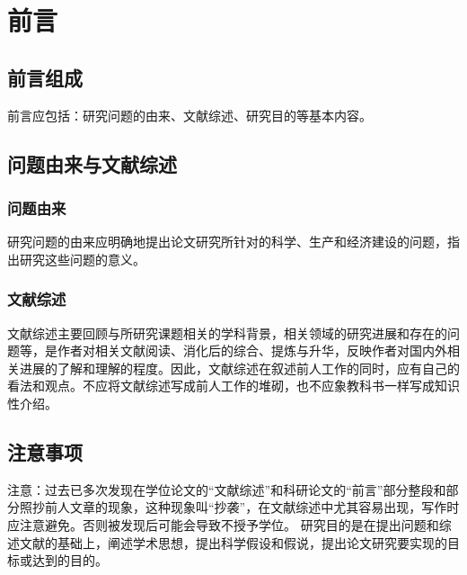 \documentclass[a4paper]{article}
\newcommand{\song}{\CJKfamily{song}}
\newcommand{\kai}{\CJKfamily{kai}}
\newcommand{\xiaosihao}{\fontsize{12pt}{18pt}\selectfont}
\newcommand{\wuhao}{\fontsize{10.5pt}{18pt}\selectfont}
\newcommand{\sectionbreak}{\clearpage} %
\newcommand\seccontent{
	\song
	\xiaosihao %
    \setlength{\parindent}{2em} %
    \setlength{\parskip}{0pt}
    }
\theoremstyle{definition}
\theoremstyle{plain}
\theoremstyle{remark}
\newcommand{\hongzifuzhu}[1]{\textcolor{red}{\kai \wuhao(#1)}}
\begin{document}
\vspace*{-1em}
\tableofcontents
\thispagestyle{main}


\clearpage
\setcounter{page}{1}
\renewcommand{\thepage}{\arabic{page}}

\seccontent
\section{前言}

\subsection{前言组成}
前言应包括：研究问题的由来、文献综述、研究目的等基本内容。


\subsection{问题由来与文献综述}


\subsubsection{问题由来}
研究问题的由来应明确地提出论文研究所针对的科学、生产和经济建设的问题，指出研究这些问题的意义。


\subsubsection{文献综述}
文献综述主要回顾与所研究课题相关的学科背景，相关领域的研究进展和存在的问题等，是作者对相关文献阅读、消化后的综合、提炼与升华，反映作者对国内外相关进展的了解和理解的程度。因此，文献综述在叙述前人工作的同时，应有自己的看法和观点。不应将文献综述写成前人工作的堆砌，也不应象教科书一样写成知识性介绍。


\subsection{注意事项}
注意：过去已多次发现在学位论文的“文献综述”和科研论文的“前言”部分整段和部分照抄前人文章的现象，这种现象叫“抄袭”，在文献综述中尤其容易出现，写作时应注意避免。否则被发现后可能会导致不授予学位。
研究目的是在提出问题和综述文献的基础上，阐述学术思想，提出科学假设和假说，提出论文研究要实现的目标或达到的目的。

\sectionbreak

\end{document}
